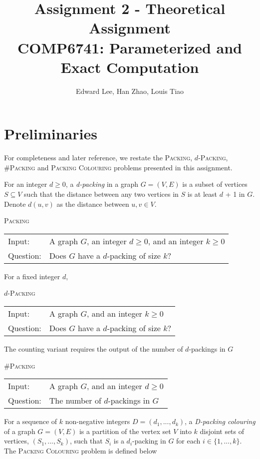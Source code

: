 \documentclass[10pt, a4paper]{article}
\title{Assignment 2 - Theoretical Assignment \\
 COMP6741: Parameterized and Exact Computation}
\author{Edward Lee, Han Zhao, Louis Tiao}
\theoremstyle{definition}
\newcommand{\n}{\\}
\begin{document}
\maketitle


\section*{Preliminaries}

For completeness and later reference, we restate the \textsc{Packing}, $d$-\textsc{Packing}, \#\textsc{Packing} and \textsc{Packing Colouring} problems presented in this assignment.

For an integer $d \geq 0$, a \emph{d-packing} in a graph $G = (V,E)$ is a subset of vertices $S \subseteq V$ such that the distance between any two vertices in $S$ is at least $d$ + 1 in $G$. Denote $d(u,v)$ as the distance between $u,v \in V$.

\begin{algorithm}[H]
\textsc{Packing\n}
\begin{tabular}{l l}
 Input:    & A graph $G$, an integer $d \geq 0$, and an integer $k \geq 0$ \n
 Question: & Does $G$ have a $d$-packing of size $k$? \n
\end{tabular}	
\end{algorithm}

For a fixed integer $d$, 

\begin{algorithm}[H]
\textsc{$d$-Packing\n}
\begin{tabular}{l l}
 Input:    & A graph $G$, and an integer $k \geq 0$ \n
 Question: & Does $G$ have a $d$-packing of size $k$? \n
\end{tabular}	
\end{algorithm}

The counting variant requires the output of the number of $d$-packings in $G$

\begin{algorithm}[H]
\textsc{\#Packing\n}
\begin{tabular}{l l}
 Input:    & A graph $G$, and an integer $d \geq 0$\n
 Question: & The number of $d$-packings in $G$ \n
\end{tabular}	
\end{algorithm}

For a sequence of $k$ non-negative integers $D = (d_1,...,d_k)$, a \emph{D-packing colouring} of a graph $G = (V,E)$ is a partition of the vertex set $V$ into $k$ disjoint sets of vertices, $(S_1,...,S_k)$, such that $S_i$ is a $d_i$-packing in $G$ for each $i \in \{1,...,k\}$. The \textsc{Packing Colouring} problem is defined below
\end{document}
